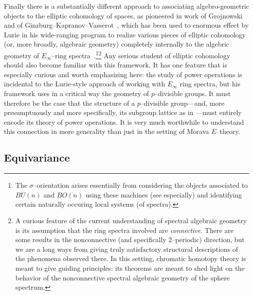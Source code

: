 Finally there is a substantially different approach to associating algebro-geometric objects to the elliptic cohomology of spaces, as pioneered in work of Grojnowski~\cite{Grojnowski} and of Ginzburg--Kapranov--Vasserot~\cite{GKV}, which has been used to enormous effect by Lurie in his wide-ranging program to realize various pieces of elliptic cohomology (or, more broadly, algebraic geometry) completely internally to the algebric geometry of \(E_\infty\)--ring spectra~\cite{LurieSurveyOfEll}.\footnote{The \(\sigma\)--orientation arises essentially from considering the objects associated to \(BU(n)\) and \(BO(n)\) using these machines (see \cite[Section 5.1]{LurieSurveyOfEll} especially) and identifying certain naturally occuring local systems (of spectra).}\footnote{A curious feature of the current understanding of spectral algebraic geometry is its assumption that the ring spectra involved are \emph{connective}.  There are some results in the nonconnective (and specifically $2$--periodic) direction, but we are a long ways from giving truly satisfactory structural descriptions of the phenomena observed there.  In this setting, chromatic homotopy theory is meant to give guiding principles: its theorems are meant to shed light on the behavior of the nonconnective spectral algebraic geometry of the sphere spectrum.}  Any serious student of elliptic cohomology should also become familiar with this framework.  It has one feature that is especially curious and worth emphasizing here: the study of power operations is incidental to the Lurie-style approach of working with \(E_\infty\) ring spectra, but his framework uses in a critical way the geometry of \(p\)--divisible groups.  It must therefore be the case that the structure of a \(p\)--divisible group---and, more presumptuously and more specifically, its subgroup lattice as in ---must entirely encode its theory of power operations.  It is very much worthwhile to understand this connection in more generality than just in the setting of Morava \(E\)--theory.







\subsection*{Equivariance}

